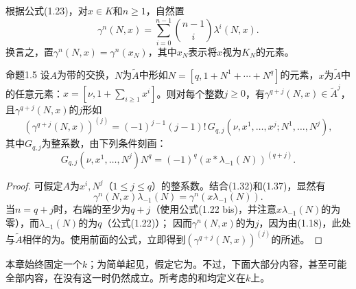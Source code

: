 根据公式(1.23)，对$x\in K$和$n\geq1$，自然置
\begin{equation}\gamma^n(N,x)=\sum_{i=0}^{n-1}\binom{n-1}{i}\lambda^i(N,x).\tag{1.37}\end{equation}
换言之，置$\gamma^n(N,x)=\gamma^n(x_N)$，其中$x_N$表示将$x$视为$K_N$的元素。
\begin{SGAresult}{命题}{1.5}
设$A$为带的交换，$N$为$\widetilde A$中形如$N=[q,1+N^1+\cdots+N^q]$的元素，$x$为$\widetilde A$中的任意元素：$x=[\nu,1+\sum_{i\geq1}x^i]$。则对每个整数$j\geq0$，有$\gamma^{q+j}(N,x)\in\widetilde A^j$，且$\gamma^{q+j}(N,x)$的$j$形如
\begin{equation}(\gamma^{q+j}(N,x))^{(j)}=(-1)^{j-1}(j-1)!\,
G_{q,j}(\nu,x^1,\ldots,x^j;N^1,\ldots,N^j),\tag{1.38}\end{equation}
其中$G_{q,j}$为整系数，由下列条件刻画：
\begin{equation}G_{q,j}(\nu,x^1,\ldots,N^j)N^q
=(-1)^q(x*\lambda_{-1}(N))^{(q+j)}.\tag{1.39}\end{equation}
\end{SGAresult}
\begin{proof}
可假定$A$为$x^i,N^j$（$1\leq j\leq q$）的整系数。结合(1.32)和(1.37)，显然有
\begin{equation}\gamma^n(N,x)\lambda_{-1}(N)=\gamma^n(x\lambda_{-1}(N)).\tag{1.40}\end{equation}
当$n=q+j$时，右端的至少为$q+j$（使用公式(1.22 bis)，并注意$x\lambda_{-1}(N)$的为零），而$\lambda_{-1}(N)$的为$q$（公式(1.22)）；
因而$\gamma^n(N,x)$的为$j$，因为由(1.18)，此处与$\widetilde A$相伴的为。使用前面的公式，立即得到$(\gamma^{q+j}(N,x))^{(j)}$的所述。
\end{proof}

本章始终固定一个$k$；为简单起见，假定它为。不过，下面大部分内容，甚至可能全部内容，在没有这一时仍然成立。所考虑的和均定义在$k$上。

